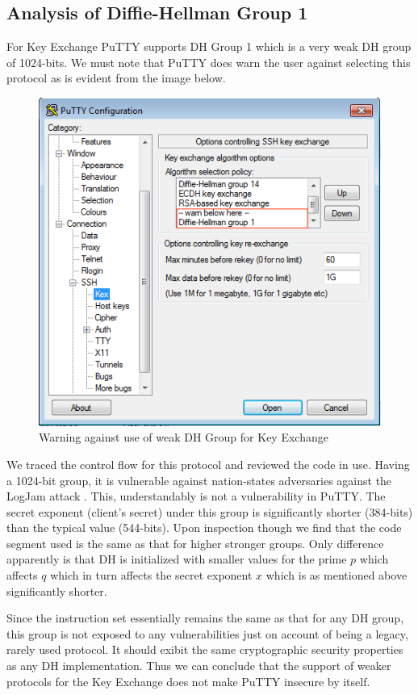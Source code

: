 \documentclass{bhamthesis}
\begin{document}
\subsection{Analysis of Diffie-Hellman Group 1}
For Key Exchange PuTTY supports DH Group 1 which is a very weak DH group of 1024-bits. We must note that PuTTY does warn the user against selecting this protocol as is evident from the image below.
\begin{figure}[ht]
\caption{Warning against use of weak DH Group for Key Exchange}
\centering
\includegraphics[width=1\textwidth]{legacy.png}
\end{figure}
We traced the control flow for this protocol and reviewed the code in use. Having a 1024-bit group, it is vulnerable against nation-states adversaries against the LogJam attack \cite{adrian}. This, understandably is not a vulnerability in PuTTY. The secret exponent (client's secret) under this group is significantly shorter (384-bits) than the typical value (544-bits). Upon inspection though we find that the code segment used is the same as that for higher stronger groups. Only difference apparently is that DH is initialized with smaller values for the prime \(p\) which affects \(q\) which in turn affects the secret exponent \(x\) which is as mentioned above significantly shorter. \par
Since the instruction set essentially remains the same as that for any DH group, this group is not exposed to any vulnerabilities just on account of being a legacy, rarely used protocol. It should exibit the same cryptographic security properties as any DH implementation. Thus we can conclude that the support of weaker protocols for the Key Exchange does not make PuTTY insecure by itself.
\end{document}
